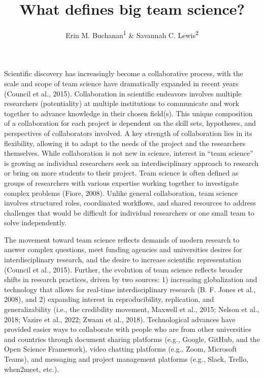 \documentclass[
  man,floatsintext]{apa7}
\title{What defines big team science?}
\author{Erin M. Buchanan\textsuperscript{1} \& Savannah C. Lewis\textsuperscript{2}}
\date{}
\affiliation{\vspace{0.5cm}\textsuperscript{1} Harrisburg University of Science and Technology\\\textsuperscript{2} University of Alabama}
\begin{document}
\maketitle

Scientific discovery has increasingly become a collaborative process,
with the scale and scope of team science have dramatically expanded in
recent years (Council et al., 2015). Collaboration in scientific endeavors
involves multiple researchers (potentiality) at multiple institutions to
communicate and work together to advance knowledge in their chosen
field(s). This unique composition of a collaboration for each project is
dependent on the skill sets, hypotheses, and perspectives of collaborators
involved. A key strength of collaboration lies in its flexibility, allowing it
to adapt to the needs of the project and the researchers themselves. While collaboration is not new in science, interest in ``team science'' is
growing as individual researchers seek an interdisciplinary approach to
research or bring on more students to their project. Team science is
often defined as groups of researchers with various expertise working
together to investigate complex problems (Fiore, 2008). Unlike general
collaboration, team science involves structured roles, coordinated
workflows, and shared resources to address challenges that would be
difficult for individual researchers or one small team to solve
independently.

The movement toward team science reflects demands of modern research to
answer complex questions, meet funding agencies and universities desires for
interdisciplinary research, and the desire to increase scientific representation
(Council et al., 2015). Further, the evolution of team science reflects broader shifts
in research practices, driven by two sources: 1) increasing globalization
and technology that allows for real-time interdisciplinary research (B. F. Jones et al., 2008), and 2) expanding interest in reproducibility, replication,
and generalizability (i.e., the credibility movement, Maxwell et al., 2015; Nelson et al., 2018; Vazire et al., 2022; Zwaan et al., 2018). Technological advances have provided easier ways to
collaborate with people who are from other universities and countries
through document sharing platforms (e.g., Google, GitHub, and the Open
Science Framework), video chatting platforms (e.g., Zoom, Microsoft
Teams), and messaging and project management platforms (e.g., Slack,
Trello, when2meet, etc.).
\end{document}
